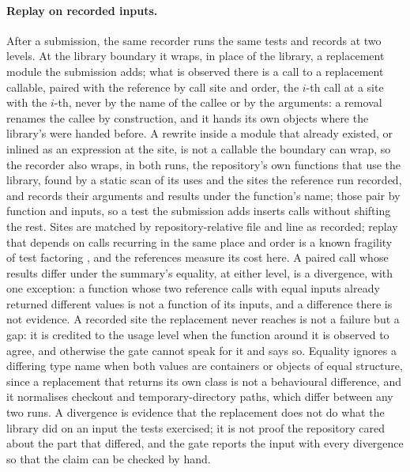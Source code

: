 \documentclass[11pt]{article}
\begin{document}
\paragraph{Replay on recorded inputs.}
After a submission, the same recorder runs the same tests and records at two levels.
At the library boundary it wraps, in place of the library, a replacement module the submission adds; what is observed there is a call to a replacement callable, paired with the reference by call site and order, the $i$-th call at a site with the $i$-th, never by the name of the callee or by the arguments: a removal renames the callee by construction, and it hands its own objects where the library's were handed before.
A rewrite inside a module that already existed, or inlined as an expression at the site, is not a callable the boundary can wrap, so the recorder also wraps, in both runs, the repository's own functions that use the library, found by a static scan of its uses and the sites the reference run recorded, and records their arguments and results under the function's name; those pair by function and inputs, so a test the submission adds inserts calls without shifting the rest.
Sites are matched by repository-relative file and line as recorded; replay that depends on calls recurring in the same place and order is a known fragility of test factoring \citep{saff2005factoring}, and the references measure its cost here.
A paired call whose results differ under the summary's equality, at either level, is a divergence, with one exception: a function whose two reference calls with equal inputs already returned different values is not a function of its inputs, and a difference there is not evidence.
A recorded site the replacement never reaches is not a failure but a gap: it is credited to the usage level when the function around it is observed to agree, and otherwise the gate cannot speak for it and says so.
Equality ignores a differing type name when both values are containers or objects of equal structure, since a replacement that returns its own class is not a behavioural difference, and it normalises checkout and temporary-directory paths, which differ between any two runs.
A divergence is evidence that the replacement does not do what the library did on an input the tests exercised; it is not proof the repository cared about the part that differed, and the gate reports the input with every divergence so that the claim can be checked by hand.
\end{document}
